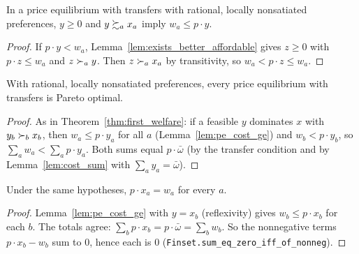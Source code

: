 \begin{lemma}
\label{lem:pe_cost_ge}
\leanok
{}
In a price equilibrium with transfers with rational, locally nonsatiated preferences, $y \ge 0$ and $y \succsim_a x_a$
imply $w_a \le p \cdot y$.
\end{lemma}
\begin{proof}
\leanok
If $p \cdot y < w_a$, Lemma~\ref{lem:exists_better_affordable} gives $z \ge 0$ with $p \cdot z \le w_a$ and
$z \succ_a y$. Then $z \succ_a x_a$ by transitivity, so $w_a < p \cdot z \le w_a$.
\end{proof}

\begin{theorem}
\label{thm:first_welfare_transfers}
\leanok
{}
With rational, locally nonsatiated preferences, every price equilibrium with transfers is Pareto optimal.
\end{theorem}
\begin{proof}
\leanok
As in Theorem~\ref{thm:first_welfare}: if a feasible $y$ dominates $x$ with $y_b \succ_b x_b$, then
$w_a \le p \cdot y_a$ for all $a$ (Lemma~\ref{lem:pe_cost_ge}) and $w_b < p \cdot y_b$, so
$\sum_a w_a < \sum_a p \cdot y_a$. Both sums equal $p \cdot \bar\omega$ (by the transfer condition and by
Lemma~\ref{lem:cost_sum} with $\sum_a y_a = \bar\omega$).
\end{proof}

\begin{theorem}
\label{thm:pe_cost_eq}
\leanok
{}
Under the same hypotheses, $p \cdot x_a = w_a$ for every $a$.
\end{theorem}
\begin{proof}
\leanok
Lemma~\ref{lem:pe_cost_ge} with $y = x_b$ (reflexivity) gives $w_b \le p \cdot x_b$ for each $b$. The totals agree:
$\sum_b p \cdot x_b = p \cdot \bar\omega = \sum_b w_b$. So the nonnegative terms $p \cdot x_b - w_b$ sum to $0$, hence
each is $0$ (\texttt{Finset.sum\_eq\_zero\_iff\_of\_nonneg}).
\end{proof}

